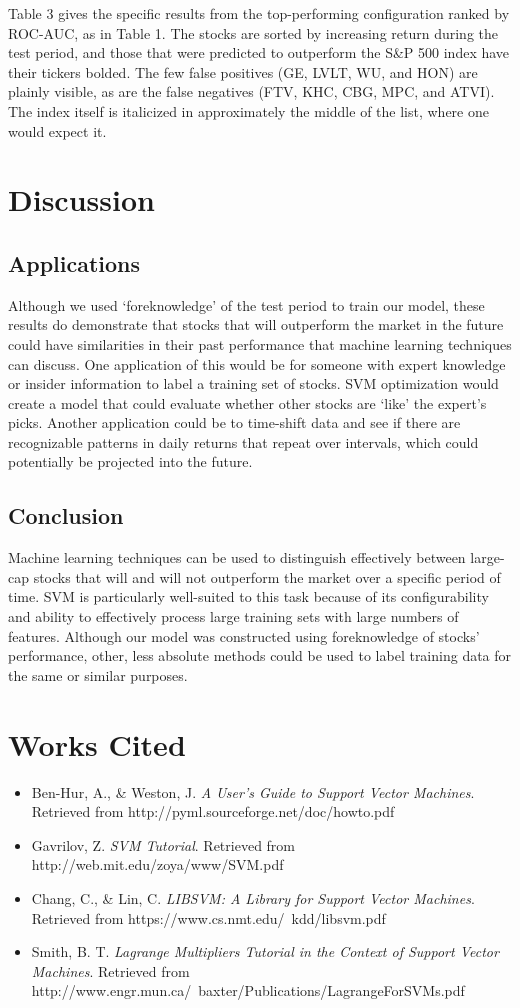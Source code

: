 \documentclass[format=acmlarge]{acmart}
\begin{document}
Table 3 gives the specific results from the top-performing configuration ranked by ROC-AUC, as in Table 1.  The stocks are sorted by increasing return during the test period, and those that were predicted to outperform the S\&P 500 index have their tickers bolded.  The few false positives (GE, LVLT, WU, and HON) are plainly visible, as are the false negatives (FTV, KHC, CBG, MPC, and ATVI).  The index itself is italicized in approximately the middle of the list, where one would expect it.

\section{Discussion}
\subsection{Applications}
Although we used `foreknowledge' of the test period to train our model, these results do demonstrate that stocks that will outperform the market in the future could have similarities in their past performance that machine learning techniques can discuss.  One application of this would be for someone with expert knowledge or insider information to label a training set of stocks.  SVM optimization would create a model that could evaluate whether other stocks are `like' the expert's picks.  Another application could be to time-shift data and see if there are recognizable patterns in daily returns that repeat over intervals, which could potentially be projected into the future.

\subsection{Conclusion}
Machine learning techniques can be used to distinguish effectively between large-cap stocks that will and will not outperform the market over a specific period of time.  SVM is particularly well-suited to this task because of its configurability and ability to effectively process large training sets with large numbers of features.  Although our model was constructed using foreknowledge of stocks' performance, other, less absolute methods could be used to label training data for the same or similar purposes.

\section{Works Cited}
\begin{itemize}
\item Ben-Hur, A., \& Weston, J. \textit{A User's Guide to Support Vector Machines}. Retrieved from http://pyml.sourceforge.net/doc/howto.pdf
\item Gavrilov, Z. \textit{SVM Tutorial}. Retrieved from http://web.mit.edu/zoya/www/SVM.pdf
\item Chang, C., \& Lin, C. \textit{LIBSVM: A Library for Support Vector Machines}. Retrieved from https://www.cs.nmt.edu/~kdd/libsvm.pdf
\item Smith, B. T. \textit{Lagrange Multipliers Tutorial in the Context of Support Vector Machines}. Retrieved from http://www.engr.mun.ca/~baxter/Publications/LagrangeForSVMs.pdf
\end{itemize}
\end{document}
